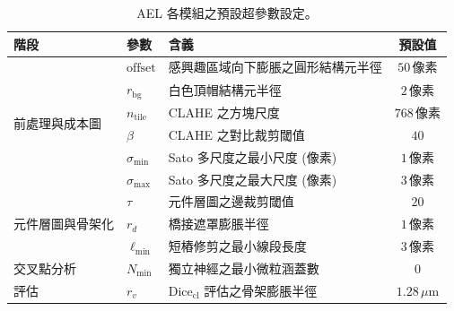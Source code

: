 \begin{table}[htbp]
  \centering
  \caption{AEL 各模組之預設超參數設定。}
  \label{tab:hyperparams}
  \begin{tabular}{lllc}
    \toprule
    階段 & 參數 & 含義 & 預設值 \\
    \midrule
    \multirow{6}{*}{前處理與成本圖}
      & $\text{offset}$                & 感興趣區域向下膨脹之圓形結構元半徑        & $50\,\text{像素}$ \\
      & $r_{\text{bg}}$                & 白色頂帽結構元半徑                 & $2\,\text{像素}$ \\
      & $n_{\text{tile}}$              & CLAHE 之方塊尺度                 & $768\,\text{像素}$ \\
      & $\beta$                        & CLAHE 之對比裁剪閾值              & $40$ \\
      & $\sigma_{\min}$                & Sato 多尺度之最小尺度 (像素)       & $1\,\text{像素}$ \\
      & $\sigma_{\max}$                & Sato 多尺度之最大尺度 (像素)       & $3\,\text{像素}$ \\
    \midrule
    \multirow{3}{*}{元件層圖與骨架化}
      & $\tau$                         & 元件層圖之邊裁剪閾值              & $20$ \\
      & $r_d$                          & 橋接遮罩膨脹半徑                  & $1\,\text{像素}$ \\
      & $\ell_{\min}$                  & 短樁修剪之最小線段長度            & $3\,\text{像素}$ \\
    \midrule
    交叉點分析 & $N_{\min}$              & 獨立神經之最小微粒涵蓋數          & $0$ \\
    \midrule
    評估       & $r_v$                  & $\text{Dice}_{\text{cl}}$ 評估之骨架膨脹半徑         & $1.28\,\mu\text{m}$ \\
    \bottomrule
  \end{tabular}
\end{table}

